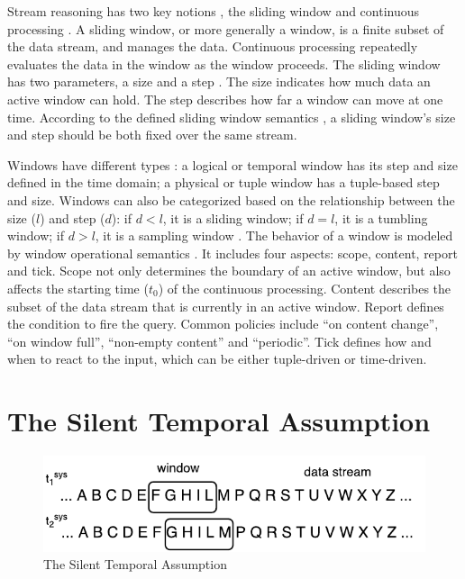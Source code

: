 Stream reasoning has two key notions \cite{barbieri2010stream}, the sliding window \cite{arasu2003stream} and continuous processing \cite{babu2001continuous}.
A sliding window, or more generally a window, is a finite subset of the data stream, and manages the data.
Continuous processing repeatedly evaluates the data in the window as the window proceeds. 
The sliding window has two parameters, a size and a step \cite{stuckenschmidt2010towards}.
The size indicates how much data an active window can hold.
The step describes how far a window can move at one time.
According to the defined sliding window semantics \cite{botan2010secret}, a sliding window's size and step should be both fixed over the same stream. 

Windows have different types \cite{barbieri2010querying}:
a logical or temporal window has its step and size defined in the time domain; 
a physical or tuple window has a tuple-based step and size.
Windows can also be categorized based on the relationship between the size ($l$) and step ($d$):
if $d < l$, it is a sliding window;
if $d = l$, it is a tumbling window;
if $d > l$, it is a sampling window \cite{calbimonte2010enabling}. 
The behavior of a window is modeled by window operational semantics \cite{botan2010secret} \cite{dell2013correctness}. 
It includes four aspects: scope, content, report and tick. 
Scope not only determines the boundary of an active window, but also affects the starting time ($t_{0}$) of the continuous processing.
Content describes the subset of the data stream that is currently in an active window.
Report defines the condition to fire the query.
Common policies include ``on content change'', ``on window full'', ``non-empty content'' and ``periodic''.
Tick defines how and when to react to the input, which can be either tuple-driven or time-driven.  
%
\section{The Silent Temporal Assumption}

\begin{figure}[!htbp]
	\centering
    \includegraphics[width=5in]{img/1-sta.pdf}
    \caption{The Silent Temporal Assumption}
    \label{fig:1-sta}
\end{figure}

